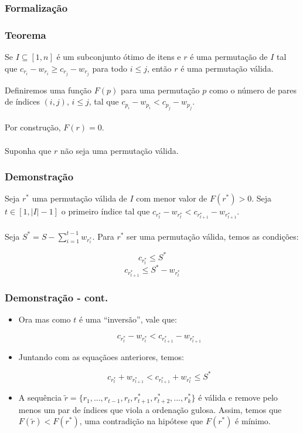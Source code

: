 \documentclass{beamer}
\begin{document}
\begin{frame}
\frametitle{Formalização}
\frametitle{Teorema}
\begin{theorem}
Se $I \subseteq [1, n]$ é um subconjunto ótimo de itens e $r$ é uma permutação de $I$ tal que $c_{r_i} - w_{r_i} \geq c_{r_j} - w_{r_j}$ para todo $i \leq j$, então $r$ é uma permutação válida.
\end{theorem}
Definiremos uma função $F(p)$ para uma permutação $p$ como o número de pares de índices $(i, j)$, $i \leq j$, tal que $c_{p_i} - w_{p_i} < c_{p_j} - w_{p_j}$.\\~\\

Por construção, $F(r) = 0$. \\~\\

Suponha que $r$ não seja uma permutação válida.

\end{frame}


\begin{frame}
\frametitle{Demonstração}


Seja $r^*$ uma permutação válida de $I$ com menor valor de $F(r^*) > 0$. Seja $t \in [1, |I| - 1]$ o primeiro índice tal que $c_{r^*_t} - w_{r^*_t} < c_{r^*_{t + 1}} - w_{r^*_{t + 1}}$.\\~\\

Seja $S^* = S - \sum_{i = 1}^{t - 1} w_{r^*_i}$. Para $r^*$ ser uma permutação válida, temos as condições:

$$c_{r^*_t} \leq S^*$$
$$c_{r^*_{t + 1}} \leq S^* - w_{r^*_t}$$

\end{frame}


\begin{frame}
\frametitle{Demonstração - cont.}

\begin{itemize}
\item Ora mas como $t$ é uma ``inversão'', vale que:

$$c_{r^*_t} - w_{r^*_t} < c_{r^*_{t + 1}} - w_{r^*_{t + 1}}$$

\item Juntando com as equaçãoes anteriores, temos:

$$c_{r^*_{t}} + w_{r^*_{t + 1}} < c_{r^*_{t + 1}} + w_{r^*_t} \leq S^*$$

\item A sequência $\widetilde{r} = \{r_1, ..., r_{t - 1}, r_t, r^*_{t + 1}, r^*_{t + 2}, ..., r^*_k\}$ é válida e remove pelo menos um par de índices que viola a ordenação gulosa. Assim, temos que $F(\widetilde{r}) < F(r^*)$, uma contradição na hipótese que $F(r^*)$ é mínimo.
\end{itemize}

\end{frame}
\end{document}
